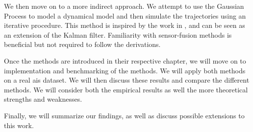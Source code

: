 We then move on to a more indirect approach. We attempt to use the Gaussian Process to model a dynamical model and then simulate the trajectories using an iterative procedure. This method is inspired by the work in \cite{pedestrian,gpekf}, and can be seen as an extension of the Kalman filter. Familiarity with sensor-fusion methods is beneficial but not required to follow the derivations.

Once the methods are introduced in their respective chapter, we will move on to implementation and benchmarking of the methods. We will apply both methods on a real \acrshort{ais} dataset. We will then discuss these results and compare the different methods. We will consider both the empirical results as well the more theoretical strengths and weaknesses. 

Finally, we will summarize our findings, as well as discuss possible extensions to this work.



